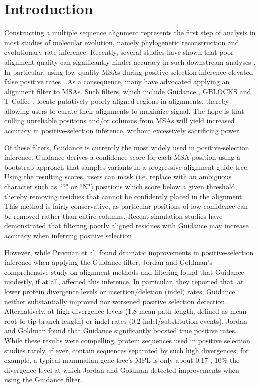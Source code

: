\documentclass[10pt]{article}
\begin{document}
\section*{Introduction}
Constructing a multiple sequence alignment represents the first step of analysis in most studies of molecular evolution, namely phylogenetic reconstruction and evolutionary rate inference. Recently, several studies have shown that poor alignment quality can significantly hinder accuracy in such downstream analyses \citep{Jordan2011, MarkovaRaina2011, Dwivedi2009, Talavera2007, Ogden2006}. In particular, using low-quality MSAs during positive-selection inference elevated false positive rates \citep{Privman2012, Schneider2009, Fletcher2010}. As a consequence, many have advocated applying an alignment filter to MSAs. Such filters, which include Guidance \citep{Penn2010, Privman2012}, GBLOCKS \citep{Castresana2000} and T-Coffee \citep{Notredame2000}, locate putatively poorly aligned regions in alignments, thereby allowing users to curate their alignments to maximize signal. The hope is that culling unreliable positions and/or columns from MSAs will yield increased accuracy in positive-selection inference, without excessively sacrificing power.

Of these filters, Guidance \citep{Penn2010} is currently the most widely used in positive-selection inference. Guidance derives a confidence score for each MSA position using a bootstrap approach that samples variants in a progressive alignment guide tree. Using the resulting scores, users can mask (i.e. replace with an ambiguous character such as ``?" or ``N") positions which score below a given threshold, thereby removing residues that cannot be confidently placed in the alignment. This method is fairly conservative, as particular positions of low confidence can be removed rather than entire columns. Recent simulation studies have demonstrated that filtering poorly aligned residues with Guidance may increase accuracy when inferring positive selection \citep{Jordan2011,Privman2012}. 

However, while Privman et al. \citet{Privman2012} found dramatic improvements in positive-selection inference when applying the Guidance filter, Jordan and Goldman's \citet{Jordan2011} comprehensive study on alignment methods and filtering found that Guidance modestly, if at all, affected this inference. In particular, they reported that, at lower protein divergence levels or insertion/deletion (indel) rates, Guidance neither substantially improved nor worsened positive selection detection. Alternatively, at high divergence levels (1.8 mean path length, defined as mean root-to-tip branch length) or indel rates (0.2 indel/substitution events), Jordan and Goldman found that Guidance significantly boosted true positive rates. While these results were compelling, protein sequences used in positive selection studies rarely, if ever, contain sequences separated by such high divergences; for example, a typical mammalian gene tree's MPL is only about 0.17 \citep{Spielman2013}, 10\% the divergence level at which Jordan and Goldman detected improvements when using the Guidance filter.
\end{document}
